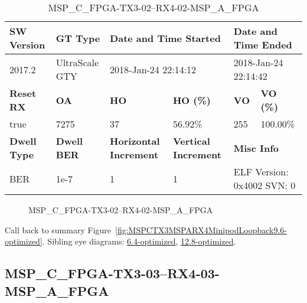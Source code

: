 \begin{table}[h]
\centering
\caption{MSP\_C\_FPGA-TX3-02--RX4-02-MSP\_A\_FPGA}
\label{tab:MSPCFPGATX302RX402MSPAFPGA9.6-optimized}
\begin{tabular}{@{}|l|l|l|l|l|l|@{}}
\toprule
\textbf{SW Version}                & \textbf{GT Type}   & \multicolumn{2}{l|}{\textbf{Date and Time Started}}            & \multicolumn{2}{l|}{\textbf{Date and Time Ended}}        \\ \midrule
2017.2                       & UltraScale GTY          & \multicolumn{2}{l|}{2018-Jan-24 22:14:12}                   & \multicolumn{2}{l|}{2018-Jan-24 22:14:42}               \\ \midrule
\textbf{Reset RX}                  & \textbf{OA} & \textbf{HO}   & \textbf{HO (\%)} & \textbf{VO} & \textbf{VO (\%)} \\ \midrule
true & 7275        & 37          & 56.92\%        & 255        & 100.00\%       \\ \midrule
\textbf{Dwell Type}                & \textbf{Dwell BER} & \textbf{Horizontal Increment} & \textbf{Vertical Increment}    & \multicolumn{2}{l|}{\textbf{Misc Info}}                  \\ \midrule
BER                            & 1e-7        & 1        & 1           & \multicolumn{2}{l|}{ELF Version: 0x4002 SVN: 0}                         \\ \bottomrule
\end{tabular}
\end{table}

\begin{figure}[h]
\caption{MSP\_C\_FPGA-TX3-02--RX4-02-MSP\_A\_FPGA} \label{fig:MSPCFPGATX302RX402MSPAFPGA9.6-optimized}
\end{figure}

Call back to summary Figure~\ref{fig:MSPCTX3MSPARX4MinipodLoopback9.6-optimized}.
Sibling eye diagrams: \hyperref[sec:MSPCFPGATX302RX402MSPAFPGA6.4-optimized]{6.4-optimized}, \hyperref[sec:MSPCFPGATX302RX402MSPAFPGA12.8-optimized]{12.8-optimized}.

\clearpage
\newpage


\subsection{MSP\_C\_FPGA-TX3-03--RX4-03-MSP\_A\_FPGA}\label{sec:MSPCFPGATX303RX403MSPAFPGA9.6-optimized}

